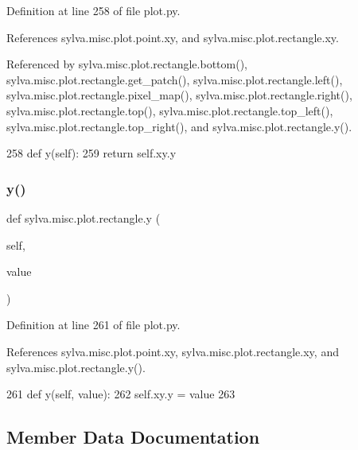 Definition at line 258 of file plot.\+py.



References sylva.\+misc.\+plot.\+point.\+xy, and sylva.\+misc.\+plot.\+rectangle.\+xy.



Referenced by sylva.\+misc.\+plot.\+rectangle.\+bottom(), sylva.\+misc.\+plot.\+rectangle.\+get\+\_\+patch(), sylva.\+misc.\+plot.\+rectangle.\+left(), sylva.\+misc.\+plot.\+rectangle.\+pixel\+\_\+map(), sylva.\+misc.\+plot.\+rectangle.\+right(), sylva.\+misc.\+plot.\+rectangle.\+top(), sylva.\+misc.\+plot.\+rectangle.\+top\+\_\+left(), sylva.\+misc.\+plot.\+rectangle.\+top\+\_\+right(), and sylva.\+misc.\+plot.\+rectangle.\+y().


\begin{DoxyCode}
258     \textcolor{keyword}{def }y(self):
259       \textcolor{keywordflow}{return} self.xy.y
\end{DoxyCode}
\mbox{\label{classsylva_1_1misc_1_1plot_1_1rectangle_a99edbd1ca0485e36233c604797adcda8}} 
\subsubsection{\texorpdfstring{y()}{y()}\hspace{0.1cm}{\footnotesize\ttfamily [2/2]}}
{\footnotesize\ttfamily def sylva.\+misc.\+plot.\+rectangle.\+y (\begin{DoxyParamCaption}\item[{}]{self,  }\item[{}]{value }\end{DoxyParamCaption})}



Definition at line 261 of file plot.\+py.



References sylva.\+misc.\+plot.\+point.\+xy, sylva.\+misc.\+plot.\+rectangle.\+xy, and sylva.\+misc.\+plot.\+rectangle.\+y().


\begin{DoxyCode}
261     \textcolor{keyword}{def }y(self, value):
262       self.xy.y = value
263 
\end{DoxyCode}


\subsection{Member Data Documentation}
\mbox{\label{classsylva_1_1misc_1_1plot_1_1rectangle_aa6bbc8337c03f65fc0097a8013f9c475}} 
